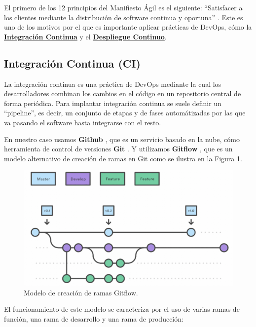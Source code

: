 \documentclass[12pt,twoside,titlepage]{report}
\begin{document}
El primero de los 12 principios del Manifiesto Ágil es el siguiente: ``Satisfacer a los clientes mediante la distribución de software continua y oportuna'' \cite{manifiestoAgil}. Este es uno de los motivos por el que es importante aplicar prácticas de DevOps, cómo la \hyperref[sec:ic]{\textbf{Integración Continua}} y el \hyperref[sec:dc]{\textbf{Despliegue Continuo}}.
\cite{devops2}

\subsection{Integración Continua (CI)}
\label{sec:ic}

La integración continua es una práctica de DevOps mediante la cual los desarrolladores combinan los cambios en el código en un repositorio central de forma periódica. Para implantar integración continua se suele definir un ``pipeline'', es decir, un conjunto de etapas y de fases automátizadas por las que va pasando el software hasta integrarse con el resto. 
\cite{ic}

En nuestro caso usamos \textbf{Github} \cite{github}, que es un servicio basado en la nube, cómo herramienta de control de versiones \textbf{Git} \cite{git}. Y utilizamos \textbf{Gitflow} \cite{gitflow}, que es un modelo alternativo de creación de ramas en Git como se ilustra en la Figura \ref{fig:Gitflow}.

\begin{figure}[H]
    \centering
    \includegraphics[scale=0.58]{DevOps/Gitflow}
    \caption{Modelo de creación de ramas Gitflow.}
    \label{fig:Gitflow}
\end{figure}

El funcionamiento de este modelo se caracteriza por el uso de varias ramas de función, una rama de desarrollo y una rama de producción:
\end{document}
